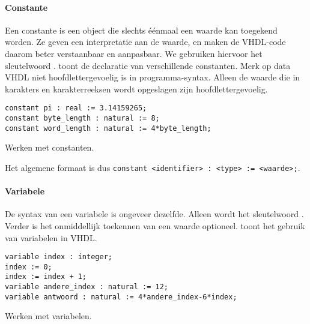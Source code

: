 \paragraph{Constante}Een constante is een object die slechts \'e\'enmaal een waarde kan toegekend worden. Ze geven een interpretatie aan de waarde, en maken de VHDL-code daarom beter verstaanbaar en aanpasbaar. We gebruiken hiervoor het sleutelwoord .  toont de declaratie van verschillende constanten. Merk op data VHDL niet hoofdlettergevoelig is in programma-syntax. Alleen de waarde die in karakters en karakterreeksen wordt opgeslagen zijn hoofdlettergevoelig.
\begin{vhdlcode}[hbt]
\begin{lstlisting}
constant pi : real := 3.14159265;
constant byte_length : natural := 8;
constant word_length : natural := 4*byte_length;
\end{lstlisting}
\caption{Werken met constanten.}
\label{lst:constante}
\end{vhdlcode}
Het algemene formaat is dus \verb+constant <identifier> : <type> := <waarde>;+.
\paragraph{Variabele}De syntax van een variabele is ongeveer dezelfde. Alleen wordt het sleutelwoord . Verder is het onmiddellijk toekennen van een waarde optioneel.  toont het gebruik van variabelen in VHDL.
\begin{vhdlcode}[hbt]
\begin{lstlisting}
variable index : integer;
index := 0;
index := index + 1;
variable andere_index : natural := 12;
variable antwoord : natural := 4*andere_index-6*index;
\end{lstlisting}
\caption{Werken met variabelen.}
\label{lst:variabele}
\end{vhdlcode}
